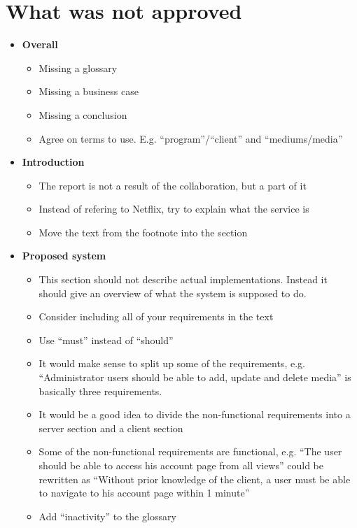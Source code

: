 \documentclass[]{article}
\begin{document}
\section*{What was not approved}
\begin{itemize}
\item \textbf{Overall}
	\begin{itemize}
	\item Missing a glossary
	\item Missing a business case
	\item Missing a conclusion
	\item Agree on terms to use. E.g. ``program''/``client'' and ``mediums/media'' \\
	\end{itemize}

\item \textbf{Introduction}
	\begin{itemize}
	\item The report is not a result of the collaboration, but a part of it
	\item Instead of refering to Netflix, try to explain what the service is
	\item Move the text from the footnote into the section
	\end{itemize}

\item \textbf{Proposed system}
	\begin{itemize}
	\item This section should not describe actual implementations. Instead it should give an overview of what the system is supposed to do.
	\item Consider including all of your requirements in the text
	\item Use ``must'' instead of ``should''
	\item It would make sense to split up some of the requirements, e.g. ``Administrator users should be able to add, update and delete media'' is basically three requirements.
	\item It would be a good idea to divide the non-functional requirements into a server section and a client section
	\item Some of the non-functional requirements are functional, e.g. ``The user should be able to access his account page from all views'' could be rewritten as ``Without prior knowledge of the client, a user must be able to navigate to his account page within 1 minute''
	\item Add ``inactivity'' to the glossary	
	\end{itemize}


\end{itemize}
\end{document}

